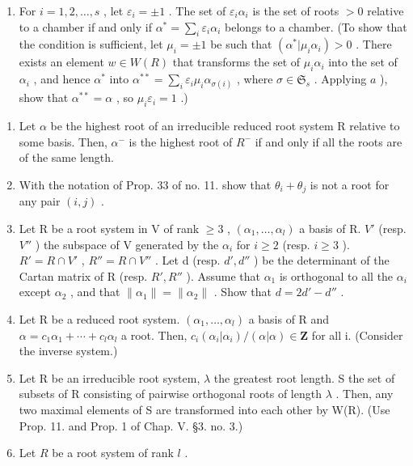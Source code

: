\begin{enumerate}
\def\labelenumi{\alph{enumi})}
\setcounter{enumi}{1}
\tightlist
\item
  For \(i = 1,2,\ldots,s\) , let \(\varepsilon_{i} = \pm 1\) . The set of \(\varepsilon_{i}\alpha_{i}\) is the set of roots \(>0\) relative to a chamber if and only if \(\alpha^{*} = \sum_{i}\varepsilon_{i}\alpha_{i}\) belongs to a chamber. (To show that the condition is sufficient, let \(\mu_{i} = \pm 1\) be such that \((\alpha^{*}|\mu_{i}\alpha_{i}) > 0\) . There exists an element \(w\in W(R)\) that transforms the set of \(\mu_{i}\alpha_{i}\) into the set of \(\alpha_{i}\) , and hence \(\alpha^{*}\) into \(\alpha^{**} = \sum_{i}\varepsilon_{i}\mu_{i}\alpha_{\sigma(i)}\) , where \(\sigma \in \mathfrak{S}_s\) . Applying \(a\) ), show that \(\alpha^{**} = \alpha\) , so \(\mu_{i}\varepsilon_{i} = 1\) .)
\end{enumerate}

\begin{enumerate}
\def\labelenumi{\arabic{enumi})}
\setcounter{enumi}{9}
\item
  Let \(\alpha\) be the highest root of an irreducible reduced root system R relative to some basis. Then, \(\alpha^{-}\) is the highest root of \(R^{-}\) if and only if all the roots are of the same length.
\item
  With the notation of Prop. 33 of no. 11. show that \(\theta_{i} + \theta_{j}\) is not a root for any pair \((i,j)\) .
\item
  Let R be a root system in V of rank \(\geqslant 3\) , \((\alpha_{1},\ldots,\alpha_{l})\) a basis of R. \(V'\) (resp. \(V''\) ) the subspace of V generated by the \(\alpha_{i}\) for \(i \geqslant 2\) (resp. \(i \geqslant 3\) ). \(R' = R \cap V'\) , \(R'' = R \cap V''\) . Let d (resp. \(d', d''\) ) be the determinant of the Cartan matrix of R (resp. \(R', R''\) ). Assume that \(\alpha_{1}\) is orthogonal to all the \(\alpha_{i}\) except \(\alpha_{2}\) , and that \(\| \alpha_{1} \| = \| \alpha_{2} \|\) . Show that \(d = 2d' - d''\) .
\item
  Let R be a reduced root system. \((\alpha_{1},\ldots,\alpha_{l})\) a basis of R and \(\alpha=c_{1}\alpha_{1}+\cdots+c_{l}\alpha_{l}\) a root. Then, \(c_{i}(\alpha_{i}|\alpha_{i})/(\alpha|\alpha)\in\mathbf{Z}\) for all i. (Consider the inverse system.)
\item
  Let R be an irreducible root system, \(\lambda\) the greatest root length. S the set of subsets of R consisting of pairwise orthogonal roots of length \(\lambda\) . Then, any two maximal elements of S are transformed into each other by W(R). (Use Prop. 11. and Prop. 1 of Chap. V. §3. no. 3.)
\item
  Let \(R\) be a root system of rank \(l\) .
\end{enumerate}

